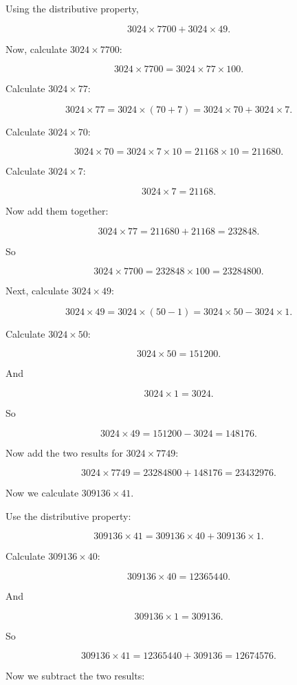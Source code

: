 Using the distributive property, 

\[ 3024 \times 7700 + 3024 \times 49. \]

Now, calculate $3024 \times 7700$:

\[ 3024 \times 7700 = 3024 \times 77 \times 100. \]

Calculate $3024 \times 77$:

\[ 3024 \times 77 = 3024 \times (70 + 7) = 3024 \times 70 + 3024 \times 7. \]

Calculate $3024 \times 70$:

\[ 3024 \times 70 = 3024 \times 7 \times 10 = 21168 \times 10 = 211680. \]

Calculate $3024 \times 7$:

\[ 3024 \times 7 = 21168. \]

Now add them together:

\[ 3024 \times 77 = 211680 + 21168 = 232848. \]

So 

\[ 3024 \times 7700 = 232848 \times 100 = 23284800. \]

Next, calculate $3024 \times 49$:

\[ 3024 \times 49 = 3024 \times (50 - 1) = 3024 \times 50 - 3024 \times 1. \]

Calculate $3024 \times 50$:

\[ 3024 \times 50 = 151200. \]

And 

\[ 3024 \times 1 = 3024. \]

So 

\[ 3024 \times 49 = 151200 - 3024 = 148176. \]

Now add the two results for $3024 \times 7749$:

\[ 3024 \times 7749 = 23284800 + 148176 = 23432976. \]

Now we calculate $309136 \times 41$.

Use the distributive property:

\[ 309136 \times 41 = 309136 \times 40 + 309136 \times 1. \]

Calculate $309136 \times 40$:

\[ 309136 \times 40 = 12365440. \]

And

\[ 309136 \times 1 = 309136. \]

So 

\[ 309136 \times 41 = 12365440 + 309136 = 12674576. \]

Now we subtract the two results:


